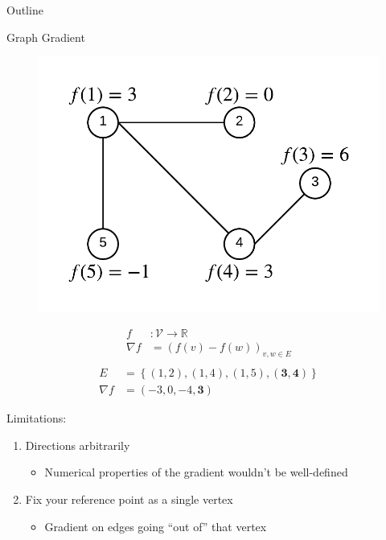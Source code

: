 \documentclass{beamer}
\begin{document}
\begin{frame}{Outline}
    \tableofcontents
\end{frame}
\begin{frame}{Graph Gradient}
  \begin{minipage}[t]{\dimexpr.4\textwidth+2em}
    \begin{figure}[ht]
      \centering
      \includegraphics[width=1.0\textwidth, height=1.0\textheight, keepaspectratio]{img/graph_gradient}
      \label{fig:graph-gradient}
    \end{figure}
  \end{minipage}
  \begin{minipage}[t]{.5\textwidth}
    \begin{align*}
      f &:\mathcal{V} \rightarrow \mathbb{R} \\
      \nabla f &= { (f(v)-f(w)) }_{ v,w\in E } \\
    \end{align*}
    \begin{align*}
      E &= \left\{(1,2), (1,4), (1,5), \boldsymbol{(3,4)}\right\} \\
      \nabla f &= (-3,0,-4,\boldsymbol{3})
    \end{align*}
  \end{minipage}
  Limitations:
  \begin{enumerate}
  \item Directions arbitrarily
    \begin{itemize}
    \item Numerical properties of the gradient wouldn't be
        well-defined
    \end{itemize}
  \item Fix your reference point as a single vertex
    \begin{itemize}
    \item Gradient on edges going ``out of'' that vertex
    \end{itemize}
  \end{enumerate}
\end{frame}
\end{document}
